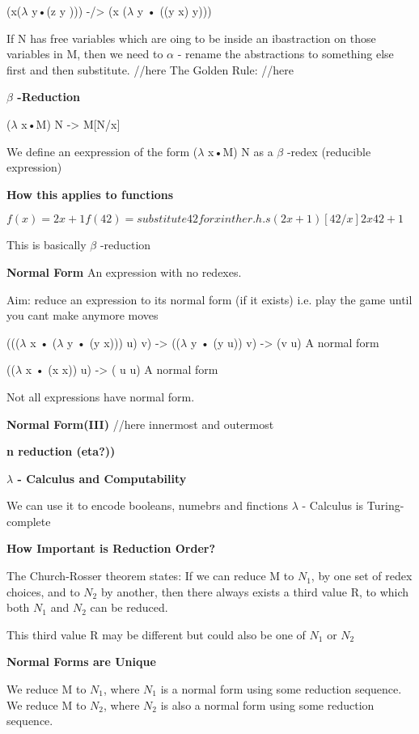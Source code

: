\documentclass{article}
\begin{document}
(x($\lambda$ y•(z y ))) -/> (x ($\lambda$ y • ((y x) y)))

If N has free variables which are oing to be inside an ibastraction on those variables in M, then we need to $\alpha$ - rename the abstractions to something else first and then substitute.
//here
The Golden Rule: //here

\textbf{$\beta$ -Reduction}

($\lambda$ x•M) N -> M[N/x]

We define an eexpression of the form 
($\lambda$ x•M) N as a $\beta$ -redex (reducible expression)


\textbf{How this applies to functions}

$f(x) = 2x + 1
f(42) = substitute 42 for x in the r.h.s
(2x+1)[42/x]
2x42+1$

This is basically $\beta$ -reduction

\textbf{Normal Form}
An expression with no redexes. 

Aim: reduce an expression to its normal form (if it exists)
i.e. play the game until you cant make anymore moves

   ((($\lambda$ x • ($\lambda$ y • (y x))) u) v)
-> (($\lambda$ y • (y u)) v)
-> (v u)	A normal form

    (($\lambda$ x • (x x)) u)
-> ( u u)	A normal form

Not all expressions have normal form.

\textbf{Normal Form(III)}
//here innermost and outermost

\textbf{n reduction (eta?))}

\textbf{$\lambda$ - Calculus and Computability}

We can use it to encode booleans, numebrs and finctions
$\lambda$ - Calculus is Turing-complete

\textbf{How Important is Reduction Order?}


The Church-Rosser theorem states:
If we can reduce M to $N_1$, by one set of redex choices, and to $N_2$ by another, then there always exists a third value R, to which both $N_1$ and $N_2$ can be reduced.

This third value R may be different but could also be one of $N_1$ or $N_2$

\textbf{Normal Forms are Unique}

We reduce M to  $N_1$, where  $N_1$ is a normal form using some reduction sequence. 
We reduce M to  $N_2$, where  $N_2$ is also a normal form using some reduction sequence. 
\end{document}
